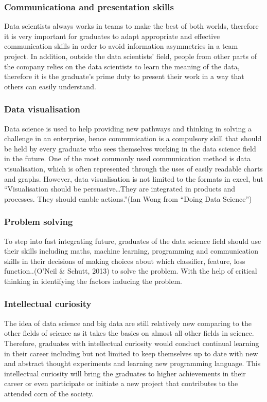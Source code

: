 \documentclass[a4paper, 11pt]{report}
\begin{document}
\subsubsection{Communicationa and presentation skills}
Data scientists always works in teams to make the best of both worlds, therefore it is very important for graduates to adapt appropriate and effective communication skills in order to avoid information asymmetries in a team project. In addition, outside the data scientists’ field, people from other parts of the company relies on the data scientists to learn the meaning of the data, therefore it is the graduate’s prime duty to present their work in a way that others can easily understand. 

\subsubsection{Data visualisation}
Data science is used to help providing new pathways and thinking in solving a challenge in an enterprise, hence communication is a compulsory skill that should be held by every graduate who sees themselves working in the data science field in the future. One of the most commonly used communication method is data visualisation, which is often represented through the uses of easily readable charts and graphs. However, data visualisation is not limited to the formats in excel, but “Visualisation should be persuasive…They are integrated in products and processes. They should enable actions.”(Ian Wong from “Doing Data Science”)

\subsubsection{Problem solving}
To step into fast integrating future, graduates of the data science field should use their skills including maths, machine learning, programming and communication skills in their decisions of making choices about which classifier, feature, loss function..(O’Neil \& Schutt, 2013) to solve the problem. With the help of critical thinking in identifying the factors inducing the problem.

\subsubsection{Intellectual curiosity}
The idea of data science and big data are still relatively new comparing to the other fields of science as it takes the basics on almost all other fields in science. Therefore, graduates with intellectual curiosity would conduct continual learning in their career including but not limited to keep themselves up to date with new and abstract thought experiments and learning new programming language. This intellectual curiosity will bring the graduates to higher achievements in their career or even participate or initiate a new project that contributes to the attended corn of the society. 
\end{document}
